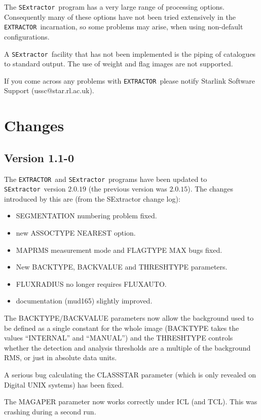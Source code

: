 \documentclass[twoside,11pt]{article}
\newcommand{\htmladdnormallink}[2]{#1}
\renewcommand{\_}{\texttt{\symbol{95}}}
\newcommand{\EXTRACTOR}{\texttt{EXTRACTOR}}
\newcommand{\SExtractor}{\texttt{SExtractor}}
\begin{document}
The \SExtractor\ program has a very large range of processing
options. Consequently many of these options have not been tried
extensively in the \EXTRACTOR\ incarnation, so some problems may
arise, when using non-default configurations.

A \SExtractor\ facility that has not been implemented is the piping of
catalogues to standard output.  The use of weight and flag images are
not supported.

If you come across any problems with \EXTRACTOR\ please notify
Starlink Software Support
(\htmladdnormallink{ussc@star.rl.ac.uk}{mailto:ussc@star.rl.ac.uk}).

\section{Changes}
\subsection{Version 1.1-0}

 The \EXTRACTOR\ and \SExtractor\ programs have been updated to \SExtractor\
 version $2.0.19$ (the previous version was $2.0.15$). The changes
 introduced by this are (from the SExtractor change log):
 \begin{itemize}
 \item SEGMENTATION numbering problem fixed.
 \item new ASSOC\_TYPE NEAREST option.
 \item MAP\_RMS measurement mode and FLAG\_TYPE MAX bugs fixed.
 \item New BACK\_TYPE, BACK\_VALUE and THRESH\_TYPE parameters.
 \item FLUX\_RADIUS no longer requires FLUX\_AUTO.
 \item documentation (mud165) slightly improved.
 \end{itemize}
 The BACK\_TYPE/BACK\_VALUE parameters now allow the background used to
 be defined as a single constant for the whole image (BACK\_TYPE takes
 the values ``INTERNAL'' and ``MANUAL'') and the THRESH\_TYPE controls
 whether the detection and analysis thresholds are a multiple of the 
 background RMS, or just in absolute data units.

 A serious bug calculating the CLASS\_STAR parameter (which is only 
 revealed on Digital UNIX systems) has been fixed.

 The MAG\_APER parameter now works correctly under ICL (and TCL). This
 was crashing during a second run.
\end{document}
